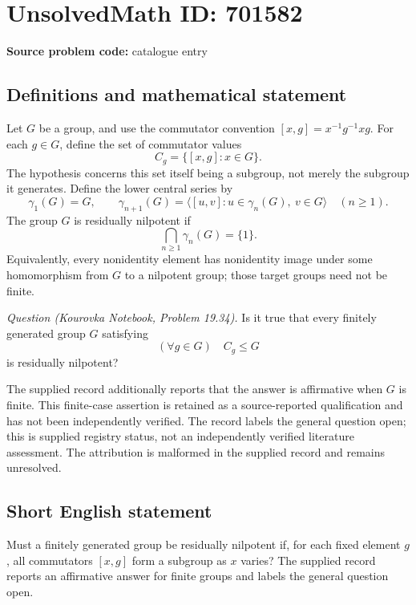 \documentclass[11pt]{article}
\begin{document}
\section*{UnsolvedMath ID: 701582}
\textbf{Source problem code:} catalogue entry
\subsection{Definitions and mathematical statement}
Let \(G\) be a group, and use the commutator convention \([x,g]=x^{-1}g^{-1}xg\). For each \(g\in G\), define the set of commutator values
\[
C_g=\{[x,g]:x\in G\}.
\]
The hypothesis concerns this set itself being a subgroup, not merely the subgroup it generates. Define the lower central series by
\[
\gamma_1(G)=G,\qquad
\gamma_{n+1}(G)=\langle [u,v]:u\in\gamma_n(G),\ v\in G\rangle
\quad(n\geq 1).
\]
The group \(G\) is residually nilpotent if
\[
\bigcap_{n\geq 1}\gamma_n(G)=\{1\}.
\]
Equivalently, every nonidentity element has nonidentity image under some homomorphism from \(G\) to a nilpotent group; those target groups need not be finite.

\emph{Question (Kourovka Notebook, Problem 19.34).} Is it true that every finitely generated group \(G\) satisfying
\[
(\forall g\in G)\quad C_g\leq G
\]
is residually nilpotent?

The supplied record additionally reports that the answer is affirmative when \(G\) is finite. This finite-case assertion is retained as a source-reported qualification and has not been independently verified. The record labels the general question open; this is supplied registry status, not an independently verified literature assessment. The attribution is malformed in the supplied record and remains unresolved.
\subsection{Short English statement}
Must a finitely generated group be residually nilpotent if, for each fixed element \(g\), all commutators \([x,g]\) form a subgroup as \(x\) varies? The supplied record reports an affirmative answer for finite groups and labels the general question open.
\end{document}
